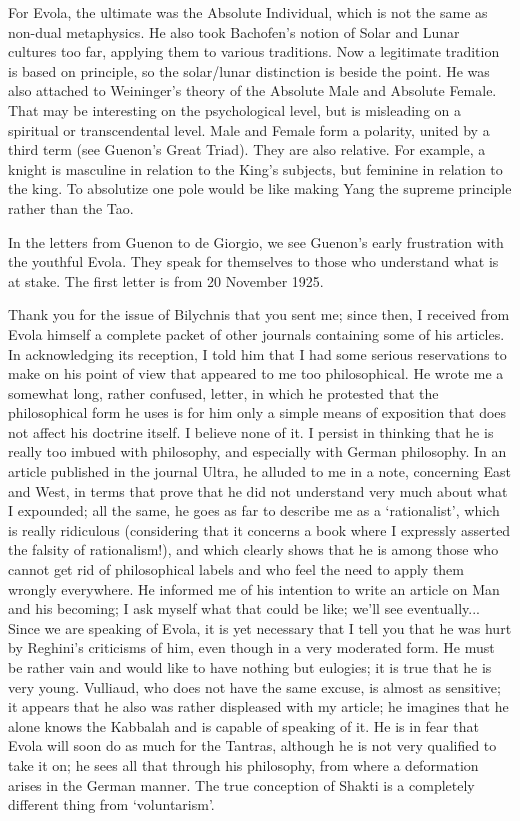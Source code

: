 For Evola, the ultimate was the Absolute Individual, which is not the same as non-dual metaphysics. He also took Bachofen's notion of Solar and Lunar cultures too far, applying them to various traditions. Now a legitimate tradition is based on principle, so the solar/lunar distinction is beside the point. He was also attached to Weininger's theory of the Absolute Male and Absolute Female. That may be interesting on the psychological level, but is misleading on a spiritual or transcendental level. Male and Female form a polarity, united by a third term (see Guenon's Great Triad). They are also relative. For example, a knight is masculine in relation to the King's subjects, but feminine in relation to the king. To absolutize one pole would be like making Yang the supreme principle rather than the Tao.

In the letters from Guenon to de Giorgio, we see Guenon's early frustration with the youthful Evola. They speak for themselves to those who understand what is at stake. The first letter is from 20 November 1925.

\begin{quotex}
Thank you for the issue of Bilychnis that you sent me; since then, I received from Evola himself a complete packet of other journals containing some of his articles. In acknowledging its reception, I told him that I had some serious reservations to make on his point of view that appeared to me too philosophical. He wrote me a somewhat long, rather confused, letter, in which he protested that the philosophical form he uses is for him only a simple means of exposition that does not affect his doctrine itself. I believe none of it. I persist in thinking that he is really too imbued with philosophy, and especially with German philosophy. In an article published in the journal Ultra, he alluded to me in a note, concerning East and West, in terms that prove that he did not understand very much about what I expounded; all the same, he goes as far to describe me as a `rationalist', which is really ridiculous (considering that it concerns a book where I expressly asserted the falsity of rationalism!), and which clearly shows that he is among those who cannot get rid of philosophical labels and who feel the need to apply them wrongly everywhere. He informed me of his intention to write an article on Man and his becoming; I ask myself what that could be like; we'll see eventually... Since we are speaking of Evola, it is yet necessary that I tell you that he was hurt by Reghini's criticisms of him, even though in a very moderated form. He must be rather vain and would like to have nothing but eulogies; it is true that he is very young. Vulliaud, who does not have the same excuse, is almost as sensitive; it appears that he also was rather displeased with my article; he imagines that he alone knows the Kabbalah and is capable of speaking of it. He is in fear that Evola will soon do as much for the Tantras, although he is not very qualified to take it on; he sees all that through his philosophy, from where a deformation arises in the German manner. The true conception of Shakti is a completely different thing from `voluntarism'.
\end{quotex}


